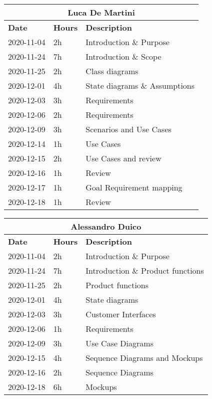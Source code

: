
\begin{table}[H]
    \centering
    \begin{tabular}{|l|l|l|}
        \multicolumn{3}{c}{\textbf{Luca De Martini}}\\
        \hline
        \textbf{Date} & \textbf{Hours} & \textbf{Description}    \\\hline
        2020-11-04    & 2h             & Introduction \& Purpose \\\hline
        2020-11-24    & 7h             & Introduction \& Scope \\\hline
        2020-11-25    & 2h             & Class diagrams \\\hline
        2020-12-01    & 4h             & State diagrams \& Assumptions \\\hline
        2020-12-03    & 3h             & Requirements \\\hline
        2020-12-06    & 2h             & Requirements \\\hline
        2020-12-09    & 3h             & Scenarios and Use Cases\\\hline
        2020-12-14    & 1h             & Use Cases\\\hline
        2020-12-15    & 2h             & Use Cases and review\\\hline
        2020-12-16    & 1h             & Review\\\hline
        2020-12-17    & 1h             & Goal Requirement mapping\\\hline
        2020-12-18    & 1h             & Review\\\hline
    \end{tabular}
\end{table}
\begin{table}[H]
    \centering
    \begin{tabular}{|l|l|l|}
        \multicolumn{3}{c}{\textbf{Alessandro Duico}}\\
        \hline
        \textbf{Date} & \textbf{Hours} & \textbf{Description}    \\\hline
        2020-11-04    & 2h             & Introduction \& Purpose \\\hline
        2020-11-24    & 7h             & Introduction \& Product functions \\\hline
        2020-11-25    & 2h             & Product functions \\\hline
        2020-12-01    & 4h             & State diagrams \\\hline
        2020-12-03    & 3h             & Customer Interfaces \\\hline
        2020-12-06    & 1h             & Requirements \\\hline
        2020-12-09    & 3h             & Use Case Diagrams \\\hline
        2020-12-15    & 4h             & Sequence Diagrams and Mockups\\\hline
        2020-12-16    & 2h             & Sequence Diagrams \\\hline
        2020-12-18    & 6h             & Mockups \\\hline
    \end{tabular}
\end{table}